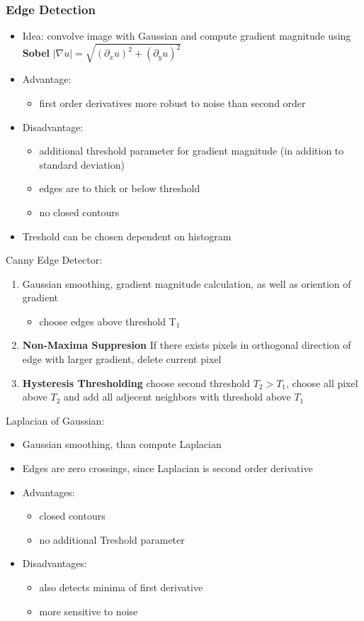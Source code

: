 \documentclass[11pt]{article}
\begin{document}
\subsubsection{Edge Detection}
\label{sec-2-3-1}
\begin{itemize}
\item Idea: convolve image with Gaussian and compute gradient magnitude using \textbf{Sobel}
     $|\nabla u | = \sqrt{(\partial_x u)^2+(\partial_y u)^2}$
\item Advantage:
\begin{itemize}
\item first order derivatives more robust to noise than second order
\end{itemize}
\item Disadvantage:
\begin{itemize}
\item additional threshold parameter for gradient magnitude (in addition to standard deviation)
\item edges are to thick or below threshold
\item no closed contours
\end{itemize}
\item Treshold can be chosen dependent on histogram
\end{itemize}
Canny Edge Detector:
\begin{enumerate}
\item Gaussian smoothing, gradient magnitude calculation, as well as oriention of gradient
\begin{itemize}
\item choose edges above threshold T$_{\text{1}}$
\end{itemize}
\item \textbf{Non-Maxima Suppresion} If there exists pixels in orthogonal direction 
of edge with larger gradient, delete current pixel
\item \textbf{Hysteresis Thresholding} choose second threshold $T_2>T_1$, choose 
all pixel above $T_2$ and add all adjecent neighbors with threshold above $T_1$
\end{enumerate}
Laplacian of Gaussian:
\begin{itemize}
\item Gaussian smoothing, than compute Laplacian
\item Edges are zero crossings, since Laplacian is second order derivative
\item Advantages:
\begin{itemize}
\item closed contours
\item no additional Treshold parameter
\end{itemize}
\item Disadvantages:
\begin{itemize}
\item also detects minima of first derivative
\item more sensitive to noise
\end{itemize}
\end{itemize}
\end{document}
